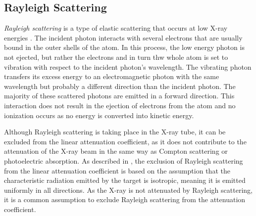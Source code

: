 \subsection{Rayleigh Scattering}
\emph{Rayleigh scattering} is a type of elastic scattering that occurs at low X-ray energies \cite[Chap. 7]{medicalImagingSystemsIntro2019:}. The incident photon interacts with several electrons that are
usually bound in the outer shells of the atom. In this process, the low energy photon is not ejected, but rather the electrons and in turn thw whole atom is
set to vibration with respect to the incident photon’s wavelength. The vibrating photon transfers its excess energy to an electromagnetic photon with the same wavelength but probably a different direction than the incident photon. The majority of these scattered photons are emitted in a forward direction. This interaction does not result in the ejection of electrons from the atom and no ionization occurs as no energy is converted into kinetic energy.

Although Rayleigh scattering is taking place in the X-ray tube, it can be 
excluded from the linear attenuation coefficient, as it does not contribute to
the attenuation of the X-ray beam in the same way as Compton scattering or
photoelectric absorption. As described in \cite{poludniowski2022calculating}, the exclusion of Rayleigh scattering from the linear attenuation coefficient is based on the assumption that the characteristic radiation emitted by the target is isotropic, meaning it is emitted uniformly in all directions. As the X-ray is not attenuated by Rayleigh scattering, it is a common assumption to exclude Rayleigh scattering from the attenuation coefficient.
